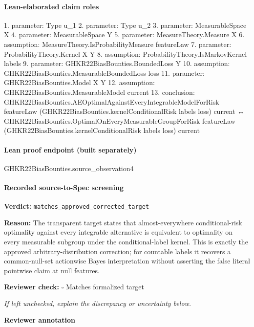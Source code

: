 \documentclass[10pt]{article}
\newcommand{\reviewerbox}{%
  \par\noindent\fbox{\parbox{0.96\linewidth}{\rule{0pt}{0.38in}}}\par
}
\newcommand{\reviewmatch}[1]{%
  \par\noindent\textbf{Reviewer check:} $\square$\; #1\par
  \noindent\emph{If left unchecked, explain the discrepancy or uncertainty below.}\par
}
\begin{document}
\paragraph{Lean-elaborated claim roles}\begin{ReviewVerbatim}
1. parameter: Type u_1
2. parameter: Type u_2
3. parameter: MeasurableSpace X
4. parameter: MeasurableSpace Y
5. parameter: MeasureTheory.Measure X
6. assumption: MeasureTheory.IsProbabilityMeasure featureLaw
7. parameter: ProbabilityTheory.Kernel X Y
8. assumption: ProbabilityTheory.IsMarkovKernel labels
9. parameter: GHKR22BiasBounties.BoundedLoss Y
10. assumption: GHKR22BiasBounties.MeasurableBoundedLoss loss
11. parameter: GHKR22BiasBounties.Model X Y
12. assumption: GHKR22BiasBounties.MeasurableModel current
13. conclusion: GHKR22BiasBounties.AEOptimalAgainstEveryIntegrableModelForRisk featureLaw
    (GHKR22BiasBounties.kernelConditionalRisk labels loss) current ↔
  GHKR22BiasBounties.OptimalOnEveryMeasurableGroupForRisk featureLaw
    (GHKR22BiasBounties.kernelConditionalRisk labels loss) current
\end{ReviewVerbatim}

\paragraph{Lean proof endpoint (built separately)}\begin{ReviewVerbatim}
GHKR22BiasBounties.source_observation4
\end{ReviewVerbatim}

\paragraph{Recorded source-to-Spec screening}
\textbf{Verdict:} \texttt{matches\_approved\_corrected\_target}
\\
{\raggedright
\textbf{Reason:} The transparent target states that almost-\allowbreak{}everywhere conditional-\allowbreak{}risk optimality against every integrable alternative is equivalent to optimality on every measurable subgroup under the conditional-\allowbreak{}label kernel.\allowbreak{} This is exactly the approved arbitrary-\allowbreak{}distribution correction;\allowbreak{} for countable labels it recovers a common-\allowbreak{}null-\allowbreak{}set actionwise Bayes interpretation without asserting the false literal pointwise claim at null features.\allowbreak{}
\par}
\reviewmatch{Matches formalized target}
\noindent\textbf{Reviewer annotation}\par
\reviewerbox
\clearpage
\hypertarget{source-claim-d280a071f8e2f046}{}
\end{document}
